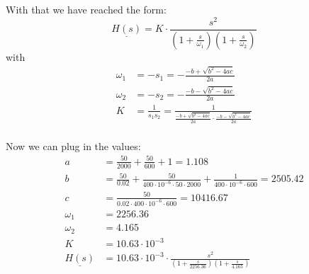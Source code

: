 \documentclass[a4paper]{article}
\begin{document}
With that we have reached the form:
\begin{equation*}
	\underline{H(s)} = K\cdot \frac{s^2}{\left(1+\frac{s}{\omega_1}\right)\left(1+\frac{s}{\omega_2}\right)}
\end{equation*}
with
\begin{align*}
	\omega_1 &= -s_1 = -\frac{-b + \sqrt{b^2 - 4ac}}{2a}\\
	\omega_2 &= -s_2 = -\frac{-b - \sqrt{b^2 - 4ac}}{2a}\\
	K &= \frac{1}{s_1s_2} = \frac{1}{\frac{-b + \sqrt{b^2 - 4ac}}{2a} \cdot \frac{-b - \sqrt{b^2 - 4ac}}{2a}}\\
\end{align*}

\pagebreak

Now we can plug in the values:
\begin{align*}
	a &= \frac{50}{2000} + \frac{50}{600} + 1 = 1.108\\
	b &= \frac{50}{0.02} + \frac{50}{400\cdot 10^{-6} \cdot 50 \cdot 2000} + \frac{1}{400\cdot 10^{-6} \cdot 600} = 2505.42\\
	c &= \frac{50}{0.02 \cdot  400\cdot 10^{-6} \cdot 600} = 10416.67\\
	\omega_1 &= 2256.36\\
	\omega_2 &= 4.165\\
	K &= 10.63 \cdot 10^{-3}\\
	\underline{H(s)} &= 10.63 \cdot 10^{-3} \cdot \frac{s^2}{\left(1+\frac{s}{2256.36}\right)\left(1+\frac{s}{4.165}\right)}
\end{align*}
\end{document}
